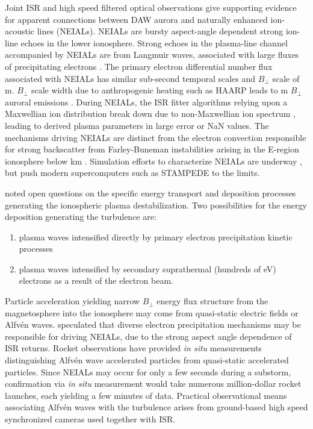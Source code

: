 Joint ISR and high speed filtered optical observations give supporting evidence for apparent connections between DAW aurora and naturally enhanced ion-acoustic lines (NEIALs).
NEIALs are bursty aspect-angle dependent strong ion-line echoes in the lower ionosphere.
Strong echoes in the plasma-line channel accompanied by NEIALs are from Langmuir waves, associated with large fluxes of precipitating electrons \citep{akbari2012}.
The primary electron differential number flux associated with NEIALs has similar sub-second temporal scales and $B_\perp$ scale of \unit[100]{m}.
$B_\perp$ scale width due to anthropogenic heating such as HAARP leads to \unit[100]{m} $B_\perp$ auroral emissions \citep{kelley1995,kendall2010}.
During NEIALs, the ISR fitter algorithms relying upon a Maxwellian ion distribution break down due to non-Maxwellian ion spectrum \citep{knudsen1993}, leading to derived plasma parameters in large error or NaN values.
The mechanisms driving NEIALs are distinct from the electron convection responsible for strong backscatter from Farley-Buneman instabilities arising in the E-region ionosphere below \unit[130]{km} \citep{oppenheim1996,hysell2013}.
Simulation efforts to characterize NEIALs are underway \citep{diaz2008}, but push modern supercomputers such as STAMPEDE to the limits.

\citet{akbari2012} noted open questions on the specific energy transport and deposition processes generating the ionospheric plasma destabilization.
Two possibilities for the energy deposition generating the turbulence are:
\begin{enumerate}
    \item plasma waves intensified directly by primary electron precipitation kinetic processes
    \item plasma waves intensified by secondary suprathermal (hundreds of eV) electrons as a result of the electron beam.
\end{enumerate}
Particle acceleration yielding narrow $B_\perp$ energy flux structure from the magnetosphere into the ionosphere may come from quasi-static electric fields or Alfvén waves.
\citet{akbari2014} speculated that diverse electron precipitation mechanisms may be responsible for driving NEIALs, due to the strong aspect angle dependence of ISR returns.
Rocket observations \citep{knudsen1990} have provided \textit{in situ} measurements distinguishing Alfvén wave accelerated particles from quasi-static accelerated particles.
Since NEIALs may occur for only a few seconds during a substorm, confirmation via \textit{in situ} measurement would take numerous million-dollar rocket launches, each yielding a few minutes of data.
Practical observational means associating Alfvén waves with the turbulence arises from ground-based high speed synchronized cameras used together with ISR.